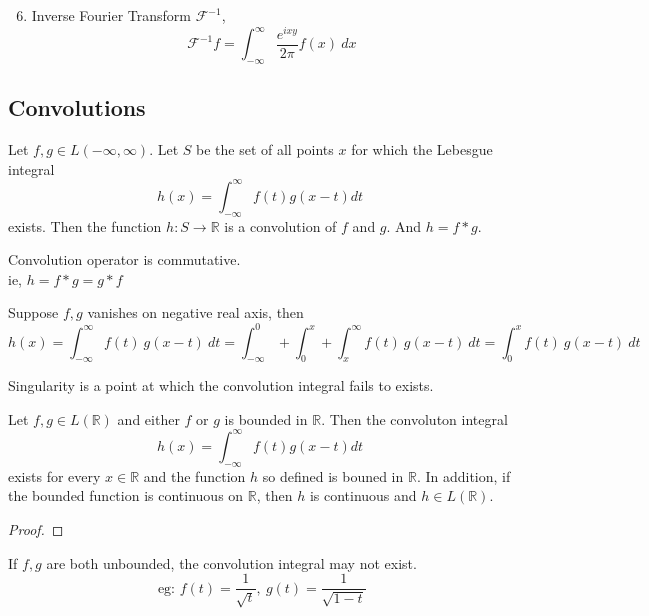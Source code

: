 \begin{enumerate}
	\setcounter{enumi}{5}
	\item Inverse Fourier Transform $\mathscr{F}^{-1}$,
		\[ \mathscr{F}^{-1}f = \int_{-\infty}^\infty \frac{e^{ixy}}{2\pi}f(x)\ dx \]
\end{enumerate}

\subsection{Convolutions}
\begin{definition}
	Let \( f,g \in L(-\infty,\infty) \). Let $S$ be the set of all points $x$ for which the Lebesgue integral
	\[ h(x) = \int_{-\infty}^\infty f(t) g(x-t) dt \]
	exists. Then the function \( h : S \to \mathbb{R} \) is a convolution of $f$ and $g$. And \( h = f \ast g \).
\end{definition}

\begin{remark}
	Convolution operator is commutative.\\
	ie, \( h = f \ast g = g \ast f \)
\end{remark}

\begin{remark}
	Suppose $f,g$ vanishes on negative real axis, then
	\[ h(x) = \int_{-\infty}^\infty f(t)\ g(x-t)\ dt = \int_{-\infty}^0 + \int_0^x  + \int_x^\infty f(t)\ g(x-t)\ dt = \int_0^x f(t)\ g(x-t)\ dt \] 
\end{remark}

\begin{remark}
	Singularity is a point at which the convolution integral fails to exists.
\end{remark}

\begin{theorem}
	Let \( f,g \in L(\mathbb{R}) \) and either $f$ or $g$ is bounded in $\mathbb{R}$. Then the convoluton integral
	\[ h(x) = \int_{-\infty}^\infty f(t) g(x-t) dt \]
	exists for every \( x \in \mathbb{R} \) and the function $h$ so defined is bouned in $\mathbb{R}$. In addition, if the bounded function is continuous on $\mathbb{R}$, then $h$ is continuous and \( h \in L(\mathbb{R}) \).
\end{theorem}
\begin{synopsis}
\end{synopsis}
\begin{proof}
\end{proof}

\begin{remark}
	If $f,g$ are both unbounded, the convolution integral may not exist.
	\[ \text{ eg: } f(t) = \frac{1}{\sqrt{t}},\ g(t) = \frac{1}{\sqrt{1-t}} \]
\end{remark}

